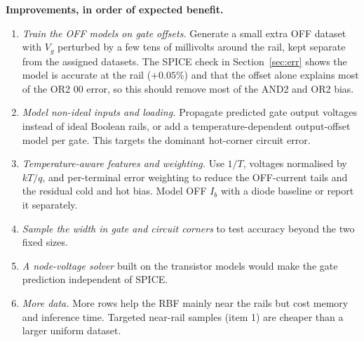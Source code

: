 \textbf{Improvements, in order of expected benefit.}
\begin{enumerate}
\item \emph{Train the OFF models on gate offsets.} Generate a small extra OFF dataset with $V_g$ perturbed by a few tens of millivolts around the rail, kept separate from the assigned datasets. The SPICE check in Section~\ref{sec:err} shows the model is accurate at the rail ($+0.05$\%) and that the offset alone explains most of the OR2 00 error, so this should remove most of the AND2 and OR2 bias.
\item \emph{Model non-ideal inputs and loading.} Propagate predicted gate output voltages instead of ideal Boolean rails, or add a temperature-dependent output-offset model per gate. This targets the dominant hot-corner circuit error.
\item \emph{Temperature-aware features and weighting.} Use $1/T$, voltages normalised by $kT/q$, and per-terminal error weighting to reduce the OFF-current tails and the residual cold and hot bias. Model OFF $I_b$ with a diode baseline or report it separately.
\item \emph{Sample the width in gate and circuit corners} to test accuracy beyond the two fixed sizes.
\item \emph{A node-voltage solver} built on the transistor models would make the gate prediction independent of SPICE.
\item \emph{More data.} More rows help the RBF mainly near the rails but cost memory and inference time. Targeted near-rail samples (item 1) are cheaper than a larger uniform dataset.
\end{enumerate}
